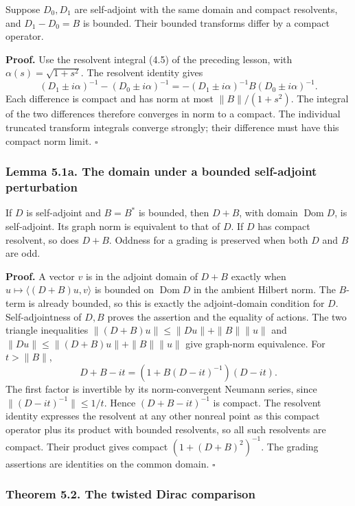 \documentclass[
  11pt,
]{article}
\begin{document}
Suppose \(D_0,D_1\) are self-adjoint with the same domain and compact
resolvents, and \(D_1-D_0=B\) is bounded. Their bounded transforms
differ by a compact operator.

\textbf{Proof.} Use the resolvent integral (4.5) of the preceding
lesson, with \(\alpha(s)=\sqrt{1+s^2}\). The resolvent identity gives \[
(D_1\pm i\alpha)^{-1}-(D_0\pm i\alpha)^{-1}
=-(D_1\pm i\alpha)^{-1}B(D_0\pm i\alpha)^{-1}.
\] Each difference is compact and has norm at most \(\|B\|/(1+s^2)\).
The integral of the two differences therefore converges in norm to a
compact. The individual truncated transform integrals converge strongly;
their difference must have this compact norm limit. \(\square\)

\subsubsection{Lemma 5.1a. The domain under a bounded self-adjoint
perturbation}\label{lemma-5.1a.-the-domain-under-a-bounded-self-adjoint-perturbation}

If \(D\) is self-adjoint and \(B=B^*\) is bounded, then \(D+B\), with
domain \(\operatorname{Dom}D\), is self-adjoint. Its graph norm is
equivalent to that of \(D\). If \(D\) has compact resolvent, so does
\(D+B\). Oddness for a grading is preserved when both \(D\) and \(B\)
are odd.

\textbf{Proof.} A vector \(v\) is in the adjoint domain of \(D+B\)
exactly when \(u\mapsto\langle (D+B)u,v\rangle\) is bounded on
\(\operatorname{Dom}D\) in the ambient Hilbert norm. The \(B\)-term is
already bounded, so this is exactly the adjoint-domain condition for
\(D\). Self-adjointness of \(D,B\) proves the assertion and the equality
of actions. The two triangle inequalities
\(\|(D+B)u\|\leq\|Du\|+\|B\|\|u\|\) and
\(\|Du\|\leq\|(D+B)u\|+\|B\|\|u\|\) give graph-norm equivalence. For
\(t>\|B\|\), \[
D+B-it=(1+B(D-it)^{-1})(D-it).
\] The first factor is invertible by its norm-convergent Neumann series,
since \(\|(D-it)^{-1}\|\leq1/t\). Hence \((D+B-it)^{-1}\) is compact.
The resolvent identity expresses the resolvent at any other nonreal
point as this compact operator plus its product with bounded resolvents,
so all such resolvents are compact. Their product gives compact
\((1+(D+B)^2)^{-1}\). The grading assertions are identities on the
common domain. \(\square\)

\subsubsection{Theorem 5.2. The twisted Dirac
comparison}\label{theorem-5.2.-the-twisted-dirac-comparison}
\end{document}
